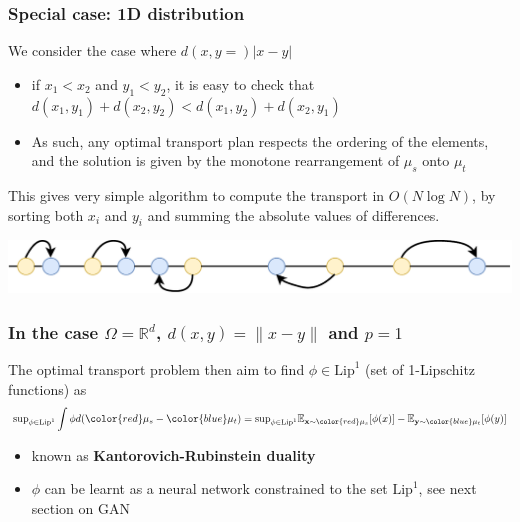 \documentclass[french,9pt]{beamer}
\newcommand{\red}[1]{{\color{red} #1}}
\newcommand{\blue}[1]{{\color{blue} #1}}
\newcommand{\x}{{\bf x}}
\newcommand{\y}{{\bf y}}
\begin{document}
\begin{frame}
  \frametitle{Special case: 1D distribution}
We consider the case where $d(x,y=)|x - y|$ 
\begin{itemize}
\item if $x_{1} < x_{2}$ and $y_{1} < y_{2}$, it is easy to check that $d(x_{1},y_{1})+d(x_{2},y_{2})<d(x_{1},y_{2})+d(x_{2},y_{1})$
\item As such, any optimal transport plan respects the ordering of the elements, and the solution is given by the monotone rearrangement of $\mu_{s}$ onto $\mu_{t}$
\end{itemize}
This gives very simple algorithm to compute the transport in $O(N\log N)$, by sorting both $x_{i}$ and $y_{i}$ and summing the absolute values of differences.
  \begin{center}
      \includegraphics[width=0.9\linewidth]{fig/transp1D}
  \end{center}
\end{frame}



\begin{frame}
  \frametitle{In the case $\Omega=\mathbb{R}^{d}$, $d(x,y)=\|x-y\|$ and $p=1$}

The optimal transport problem then aim to find $\phi \in \text{Lip}^1$ (set of 1-Lipschitz functions) as
\begin{equation}
\text{sup}_{\phi \in \text{Lip}^1} \int \phi d(\red {\mu_{s}} - \blue{\mu_{t}}) = \text{sup}_{\phi \in \text{Lip}^1} \mathbb{E}_{\x\sim\red {\mu_{s}} } [\phi(x)] - \mathbb{E}_{\y\sim\blue{\mu_{t}} } [\phi(y)]
\end{equation}
\begin{itemize}
\item known as {\bf Kantorovich-Rubinstein duality}
\item $\phi$ can be learnt as a neural network constrained to the set $\text{Lip}^1$, see next section on GAN
\end{itemize}

\end{frame}


\end{document}
